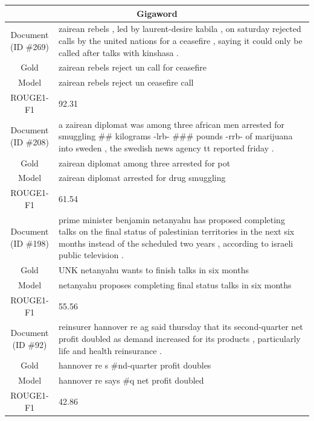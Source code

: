 \begin{table}[bth!]
\scriptsize
\centering
\renewcommand{\arraystretch}{1.3}
\begin{tabular}{c|p{}}
\hline
\multicolumn{2}{c}{Gigaword} \\ \hline
\makecell{Document\\(ID \#269)} & 
zairean rebels , led by laurent-desire kabila , on saturday rejected calls by the united nations for a ceasefire , saying it could only be called after talks with kinshasa .
\\ \hline
Gold & 
zairean rebels reject un call for ceasefire
\\ \hline
Model & 
zairean rebels reject un ceasefire call
\\ \hline
ROUGE1-F1 & 
92.31
\\ \hline
\makecell{Document\\(ID \#208)} & 
a zairean diplomat was among three african men arrested for smuggling \#\# kilograms -lrb- \#\#\# pounds -rrb- of marijuana into sweden , the swedish news agency tt reported friday .
\\ \hline
Gold & 
zairean diplomat among three arrested for pot
\\ \hline
Model & 
zairean diplomat arrested for drug smuggling
\\ \hline
ROUGE1-F1 & 
61.54
\\ \hline
\makecell{Document\\(ID \#198)} & 
prime minister benjamin netanyahu has proposed completing talks on the final status of palestinian territories in the next six months instead of the scheduled two years , according to israeli public television .
\\ \hline
Gold & 
UNK netanyahu wants to finish talks in six months
\\ \hline
Model & 
netanyahu proposes completing final status talks in six months
\\ \hline
ROUGE1-F1 & 
55.56
\\ \hline
\makecell{Document\\(ID \#92)} & 
reinsurer hannover re ag said thursday that its second-quarter net profit doubled as demand increased for its products , particularly life and health reinsurance .
\\ \hline
Gold & 
hannover re s \#nd-quarter profit doubles
\\ \hline
Model & 
hannover re says \#q net profit doubled
\\ \hline
ROUGE1-F1 & 
42.86
\\ \hline

\end{tabular}
\end{table}
